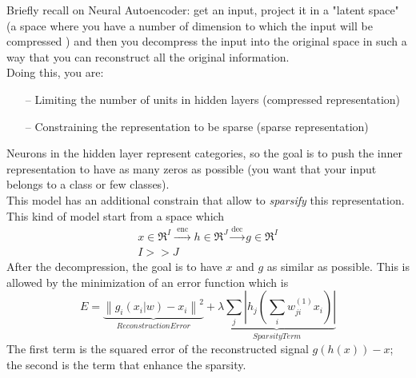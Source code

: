 Briefly recall on Neural Autoencoder: get an input, project it in a "latent space" (a space where you have a number of dimension to which the input will be compressed ) and then you decompress the input into the original space in such a way that you can reconstruct all the original information.\\
Doing this, you are:
\begin{itemize}
    \item[--] Limiting the number of units in hidden layers (compressed representation)
    \item[--] Constraining the representation to be sparse (sparse representation)
\end{itemize}{}
Neurons in the hidden layer represent categories, so the goal is to push the inner representation to have as many zeros as possible (you want that your input belongs to a class or few classes). \\
This model has an additional constrain that allow to \textit{sparsify} this representation. \\
This kind of model start from a space which 
$$
\begin{array}{c}
{x \in \mathfrak{R}^{I} \stackrel{\text { enc }}{\longrightarrow} h \in \mathfrak{R}^{J} \stackrel{\text {dec}}{\longrightarrow} g \in \mathfrak{R}^{I}} \\
{I >> J}
\end{array}
$$
After the decompression, the goal is to have $x$ and $g$ as similar as possible. This is allowed by the minimization of an error function which is 
$$
E=\underbrace{\left\|g_{i}\left(x_{i} | w\right)-x_{i}\right\|^{2}}_{Reconstruction Error}+\underbrace{\lambda \sum_{j}\left|h_{j}\left(\sum_{i} w_{j i}^{(1)} x_{i}\right)\right|}_{Sparsity Term}
$$
The first term is the squared error of the reconstructed signal $g(h(x)) - x$; the second is the term that enhance the sparsity.


